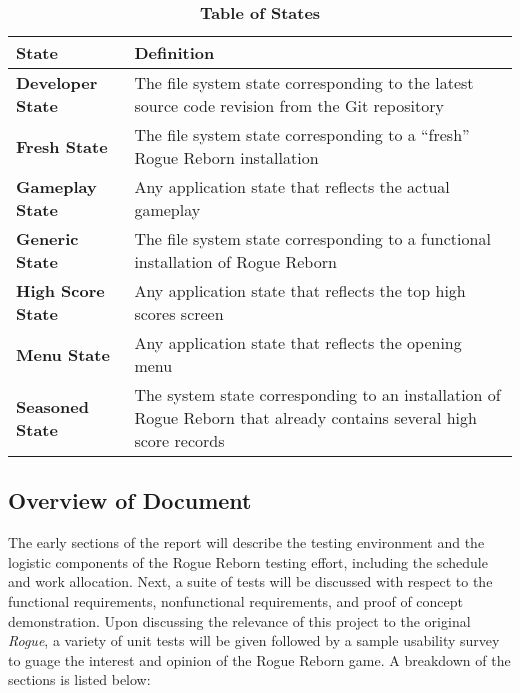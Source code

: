 \documentclass[12pt, titlepage]{article}
\begin{document}
		\begin{table}[H]
			\centering
			\caption{\textbf{Table of States}}
			\label{StateDefinitions}
			\bigskip
			\begin{tabularx}{\textwidth}{p{3.5cm}X}
				\toprule
				\textbf{State} & \textbf{Definition}\\
				\midrule
				\textbf{Developer State} & The file system state corresponding to the latest source code revision from the Git repository\\
				\textbf{Fresh State} & The file system state corresponding to a ``fresh'' Rogue Reborn installation\\
				\textbf{Gameplay State} & Any application state that reflects the actual gameplay\\
				\textbf{Generic State} & The file system state corresponding to a functional installation of Rogue Reborn\\
				\textbf{High Score State} & Any application state that reflects the top high scores screen\\
				\textbf{Menu State} & Any application state that reflects the opening menu\\
				\textbf{Seasoned State} & The system state corresponding to an installation of Rogue Reborn that already contains several high score records\\
				\bottomrule
			\end{tabularx}
		\end{table}	

	\subsection{Overview of Document}
		The early sections of the report will describe the testing environment and the logistic components of the Rogue Reborn testing effort, including the schedule and work allocation.  Next, a suite of tests will be discussed with respect to the functional requirements, nonfunctional requirements, and proof of concept demonstration.  Upon discussing the relevance of this project to the original \textit{Rogue}, a variety of unit tests will be given followed by a sample usability survey to guage the interest and opinion of the Rogue Reborn game.  A breakdown of the sections is listed below:
\end{document}
